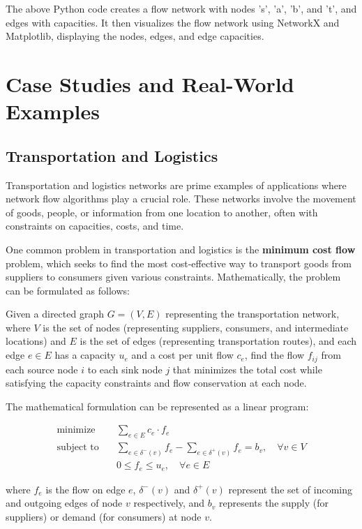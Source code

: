 \documentclass[12pt]{book} %
\begin{document}
The above Python code creates a flow network with nodes 's', 'a', 'b', and 't', and edges with capacities. It then visualizes the flow network using NetworkX and Matplotlib, displaying the nodes, edges, and edge capacities.


\section{Case Studies and Real-World Examples}

\subsection{Transportation and Logistics}
Transportation and logistics networks are prime examples of applications where network flow algorithms play a crucial role. These networks involve the movement of goods, people, or information from one location to another, often with constraints on capacities, costs, and time.

One common problem in transportation and logistics is the \textbf{minimum cost flow} problem, which seeks to find the most cost-effective way to transport goods from suppliers to consumers given various constraints. Mathematically, the problem can be formulated as follows:

Given a directed graph \(G = (V, E)\) representing the transportation network, where \(V\) is the set of nodes (representing suppliers, consumers, and intermediate locations) and \(E\) is the set of edges (representing transportation routes), and each edge \(e \in E\) has a capacity \(u_e\) and a cost per unit flow \(c_e\), find the flow \(f_{ij}\) from each source node \(i\) to each sink node \(j\) that minimizes the total cost while satisfying the capacity constraints and flow conservation at each node.

The mathematical formulation can be represented as a linear program:

\[
\begin{aligned}
\text{minimize} \quad & \sum_{e \in E} c_e \cdot f_e \\
\text{subject to} \quad & \sum_{e \in \delta^-(v)} f_e - \sum_{e \in \delta^+(v)} f_e = b_v, \quad \forall v \in V \\
& 0 \leq f_e \leq u_e, \quad \forall e \in E
\end{aligned}
\]

where \(f_e\) is the flow on edge \(e\), \(\delta^-(v)\) and \(\delta^+(v)\) represent the set of incoming and outgoing edges of node \(v\) respectively, and \(b_v\) represents the supply (for suppliers) or demand (for consumers) at node \(v\).
\end{document}
